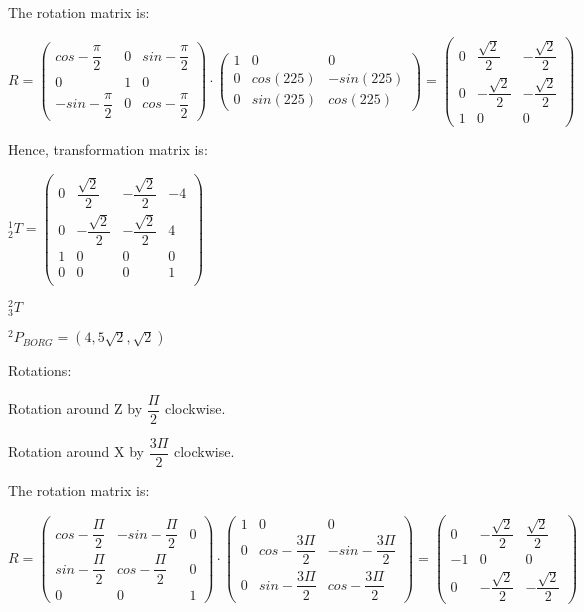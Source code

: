 \documentclass[12pt]{article}
\begin{document}
\begin{list}{)~}{}
The rotation matrix is:

$R=\left(\begin{array}{ccc}
cos -\dfrac{\pi}{2} & 0 & sin -\dfrac{\pi}{2} \\
0 & 1 & 0\\
-sin -\dfrac{\pi}{2} & 0 & cos -\dfrac{\pi}{2} 
\end{array}\right)
\cdot
\left(\begin{array}{ccc}
1 & 0 & 0 \\
0 & cos\left(225\right) & -sin\left(225\right)  \\
0 & sin\left(225\right) & cos\left(225\right)\end{array}\right)=
\left(\begin{array}{ccc}
0 & \dfrac{\sqrt{2}}{2} & -\dfrac{\sqrt{2}}{2} \\
0 & -\dfrac{\sqrt{2}}{2} & -\dfrac{\sqrt{2}}{2} \\
1 & 0 & 0\end{array}\right)$

Hence, transformation matrix is:
 
$_{2}^1T = \left(\begin{array}{cccc}
0 & \dfrac{\sqrt{2}}{2} & -\dfrac{\sqrt{2}}{2} & -4 \\
0 & -\dfrac{\sqrt{2}}{2} & -\dfrac{\sqrt{2}}{2} &  4 \\
1 & 0 & 0 & 0\\
0 & 0 & 0 & 1\\
\end{array}\right)$

\item
$_{3}^2T$

$^2 P_{BORG} = \left(4, 5\sqrt{2}, \sqrt{2}\right)$

Rotations:
\begin{list}{)~}{}
\item Rotation around Z by $\dfrac{\Pi}{2}$ clockwise.
\item Rotation around X by $\dfrac{3 \Pi}{2}$ clockwise.
\end{list}
 
The rotation matrix is:

$R=\left(\begin{array}{ccc}
cos -\dfrac{\Pi}{2} & -sin -\dfrac{\Pi}{2} & 0 \\
sin -\dfrac{\Pi}{2} & cos -\dfrac{\Pi}{2} & 0\\
0 & 0 & 1\end{array}\right)\cdot 
\left(\begin{array}{ccc}
1 & 0 & 0 \\
0 & cos -\dfrac{3 \Pi}{2} & -sin -\dfrac{3 \Pi}{2}  \\
0 & sin -\dfrac{3 \Pi}{2} & cos -\dfrac{3 \Pi}{2} \end{array}\right)=
\left(\begin{array}{ccc}
0 & - \dfrac{\sqrt{2}}{2} &  \dfrac{\sqrt{2}}{2} \\
-1 & 0 & 0 \\
0 & - \dfrac{\sqrt{2}}{2} & - \dfrac{\sqrt{2}}{2}\end{array}\right)$ 
\end{list}
\end{document}
